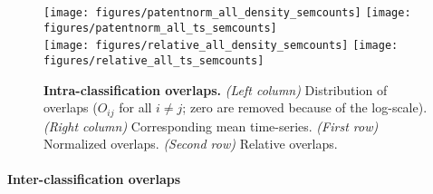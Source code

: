 \documentclass[10pt,A4]{article}
\begin{document}
\begin{figure}[!ht]
\centering


\texttt{[image: figures/patentnorm\_all\_density\_semcounts]}
\texttt{[image: figures/patentnorm\_all\_ts\_semcounts]} \\
\texttt{[image: figures/relative\_all\_density\_semcounts]}
\texttt{[image: figures/relative\_all\_ts\_semcounts]} 

\caption{
\textbf{Intra-classification overlaps.}
\textit{(Left column)} Distribution of overlaps ($O_{ij}$ for all $i\neq j$; zero are removed because of the log-scale). \textit{(Right column)} Corresponding mean time-series. \textit{(First row)} Normalized overlaps. \textit{(Second row)} Relative overlaps.}
\label{fig:intra-classif-overlap}
\end{figure}


\paragraph{Inter-classification overlaps}
\end{document}
